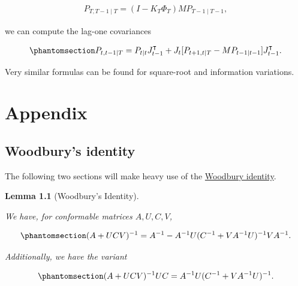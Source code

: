 \documentclass[
]{report}
\theoremstyle{plain}
\newtheorem{lemma}{Lemma}[section]
\theoremstyle{plain}
\theoremstyle{remark}
\begin{document}
\[\begin{split}
P_{T,T-1\mid T} = (I - K_T\Phi_{T}) MP_{T-1\mid T-1},
\end{split}
\]

we can compute the lag-one covariances

\begin{equation}\phantomsection\label{eq-lag1smooth}{\begin{split}
P_{t, t-1\mid T} = P_{t\mid t}J_{t-1}^\intercal + J_{t}[P_{t+1,t\mid T} - MP_{t-1\mid t-1}]J_{t-1}^\intercal.
\end{split}
}\end{equation}

Very similar formulas can be found for square-root and information
variations.

\newpage
\appendix
\renewcommand{\thefigure}{A\arabic{figure}}
\renewcommand{\thetable}{A\arabic{table}}
\setcounter{figure}{0}
\setcounter{table}{0}

\chapter{Appendix}\label{appendix}

\section{Woodbury's identity}\label{woodburys-identity}

The following two sections will make heavy use of the
\href{https://en.wikipedia.org/wiki/Woodbury_matrix_identity}{Woodbury
identity}.

\begin{lemma}[Woodbury's
Identity]\protect\hypertarget{lem-woodbury}{}\label{lem-woodbury}

We have, for conformable matrices \(A, U, C, V\),

\begin{equation}\phantomsection\label{eq-woodbury}{\begin{split}
(A + UCV)^{-1} = A^{-1} - A^{-1} U (C^{-1} + VA^{-1}U)^{-1}VA^{-1}.
\end{split}
}\end{equation}

Additionally, we have the variant

\begin{equation}\phantomsection\label{eq-woodbury2}{\begin{split}
(A + UCV)^{-1}UC = A^{-1} U(C^{-1} + VA^{-1}U)^{-1}.
\end{split}
}\end{equation}

\end{lemma}
\end{document}
